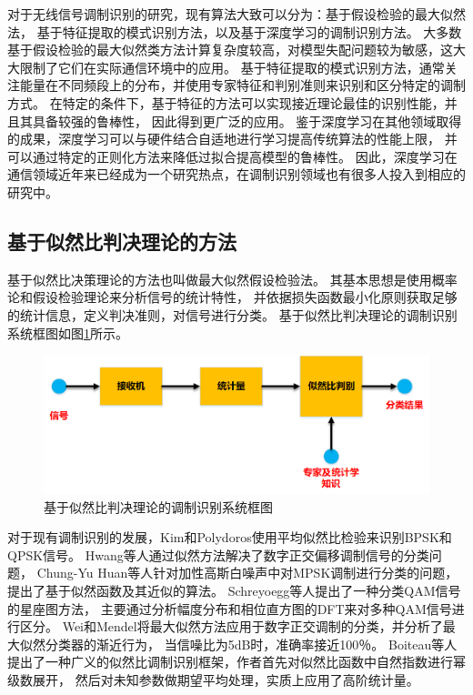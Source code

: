 对于无线信号调制识别的研究，现有算法大致可以分为：基于假设检验的最大似然法，
基于特征提取的模式识别方法，以及基于深度学习的调制识别方法。
大多数基于假设检验的最大似然类方法计算复杂度较高，对模型失配问题较为敏感，这大大限制了它们在实际通信环境中的应用。
基于特征提取的模式识别方法，通常关注能量在不同频段上的分布，并使用专家特征和判别准则来识别和区分特定的调制方式。
在特定的条件下，基于特征的方法可以实现接近理论最佳的识别性能，并且其具备较强的鲁棒性，
因此得到更广泛的应用。
鉴于深度学习在其他领域取得的成果，深度学习可以与硬件结合自适地进行学习提高传统算法的性能上限，
并可以通过特定的正则化方法来降低过拟合提高模型的鲁棒性。
因此，深度学习在通信领域近年来已经成为一个研究热点，在调制识别领域也有很多人投入到相应的研究中。\par

\subsection{基于似然比判决理论的方法}

基于似然比决策理论的方法也叫做最大似然假设检验法。 
其基本思想是使用概率论和假设检验理论来分析信号的统计特性，
并依据损失函数最小化原则获取足够的统计信息，定义判决准则，对信号进行分类。
基于似然比判决理论的调制识别系统框图如图\ref{sec:fig_1_0}所示。\par

\begin{figure}[!h]
	\centering
	\includegraphics[scale=0.55]{figures/chapter_1/fig_1_0}
	\caption{基于似然比判决理论的调制识别系统框图} \label{sec:fig_1_0}
\end{figure}

对于现有调制识别的发展，Kim和Polydoros使用平均似然比检验来识别BPSK和QPSK信号\cite{kim1988digital}。
Hwang等人通过似然方法解决了数字正交偏移调制信号的分类问题\cite{hwang1991advanced}，
Chung-Yu Huan等人针对加性高斯白噪声中对MPSK调制进行分类的问题，
提出了基于似然函数及其近似的算法\cite{huan1995likelihood}。
Schreyoegg等人提出了一种分类QAM信号的星座图方法，
主要通过分析幅度分布和相位直方图的DFT来对多种QAM信号进行区分\cite{Schreyogg2002Modulation}。 
Wei和Mendel将最大似然方法应用于数字正交调制的分类，并分析了最大似然分类器的渐近行为，
当信噪比为5dB时，准确率接近100％\cite{wei2000maximum}。
Boiteau等人提出了一种广义的似然比调制识别框架，作者首先对似然比函数中自然指数进行幂级数展开，
然后对未知参数做期望平均处理，实质上应用了高阶统计量\cite{boiteau1998general}。
\par

